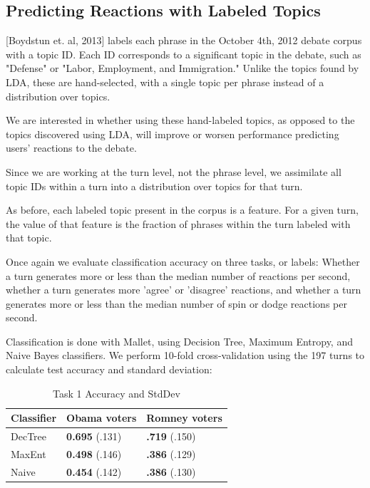 

\subsection{Predicting Reactions with Labeled Topics}

[Boydstun et. al, 2013] labels each phrase in the October 4th, 2012 debate corpus with a topic ID. Each ID corresponds to a significant topic in the debate, such as "Defense" or "Labor, Employment, and Immigration." Unlike the topics found by LDA, these are hand-selected, with a single topic per phrase instead of a distribution over topics.

We are interested in whether using these hand-labeled topics, as opposed to the topics discovered using LDA, will improve or worsen performance predicting users' reactions to the debate.

Since we are working at the turn level, not the phrase level, we assimilate all topic IDs within a turn into a distribution over topics for that turn.

As before, each labeled topic present in the corpus is a feature. For a given turn, the value of that feature is the fraction of phrases within the turn labeled with that topic.

Once again we evaluate classification accuracy on three tasks, or labels: Whether a turn generates more or less than the median number of reactions per second, whether a turn generates more 'agree' or 'disagree' reactions, and whether a turn generates more or less than the median number of spin or dodge reactions per second.

Classification is done with Mallet, using Decision Tree, Maximum Entropy, and Naive Bayes classifiers. We perform 10-fold cross-validation using the 197 turns to calculate test accuracy and standard deviation:

\begin{table}[H]
\begin{centering}
\begin{tabular}{ l | l | l }
Classifier & Obama voters & Romney voters \\
\hline
DecTree & \textbf{0.695} (.131) &  \textbf{.719} (.150) \\
MaxEnt & \textbf{0.498} (.146) &  \textbf{.386} (.129) \\
Naive & \textbf{0.454} (.142) &  \textbf{.386} (.130) \\
\end{tabular}
\caption{Task 1 Accuracy and StdDev}
\end{centering}
\end{table}

